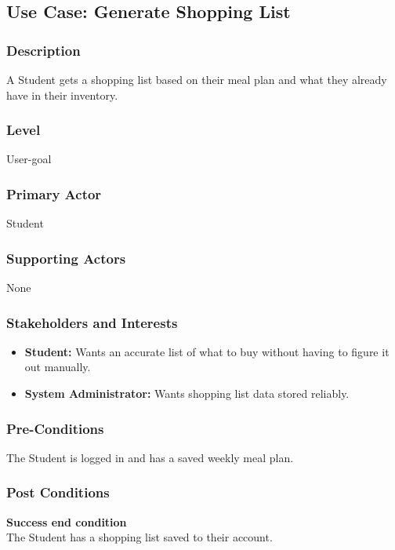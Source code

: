 \documentclass[10pt,letterpaper]{article}
\begin{document}
\subsection*{Use Case: Generate Shopping List}

\subsubsection*{Description}
A Student gets a shopping list based on their meal plan and what they already have in their inventory.

\subsubsection*{Level}
User-goal

\subsubsection*{Primary Actor}
Student

\subsubsection*{Supporting Actors}
None

\subsubsection*{Stakeholders and Interests}
\begin{itemize}
    \item \textbf{Student:} Wants an accurate list of what to buy without having to figure it out manually.
    \item \textbf{System Administrator:} Wants shopping list data stored reliably.
\end{itemize}

\subsubsection*{Pre-Conditions}
The Student is logged in and has a saved weekly meal plan.

\subsubsection*{Post Conditions}

\textbf{Success end condition}\\
The Student has a shopping list saved to their account.
\end{document}
